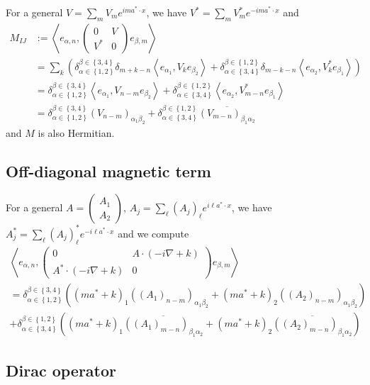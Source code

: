 \documentclass[11pt,a4paper,reqno,french,tikz]{amsart}
\newcommand{\pa}[1]{\left( #1 \right)} %
\newcommand{\acs}[1]{\left\{ #1 \right\}} %
\newcommand{\ps}[1]{\left< #1 \right>} %
\newcommand{\na}{\nabla} %
\newcommand{\mat}[1]{\begin{pmatrix} #1 \end{pmatrix}} %
\begin{document}
For a general $V = \sum_m V_m e^{im a^* \cdot x}$, we have $V^* = \sum_m V_m^* e^{-im a^* \cdot x}$ and
\begin{align*}
	M_{IJ} & := \ps{e_{\alpha,n}, \mat{0 & V \\ V^* & 0} e_{\beta,m}} \\
	       &= \sum_{k} \pa{\delta_{\alpha \in \acs{1,2}}^{\beta \in \acs{3,4}} \delta_{m+k-n} \ps{e_{\alpha_1},V_k e_{\beta_2}} + \delta_{\alpha \in \acs{3,4}}^{\beta \in \acs{1,2}}\delta_{m-k-n} \ps{e_{\alpha_2},V_k^* e_{\beta_1}}} \\
	       &=   \delta_{\alpha \in \acs{1,2}}^{\beta \in \acs{3,4}}\ps{e_{\alpha_1},V_{n-m} e_{\beta_2}} + \delta_{\alpha \in \acs{3,4}}^{\beta \in \acs{1,2}}\ps{e_{\alpha_2},V_{m-n}^* e_{\beta_1}} \\
	       &=     \delta_{\alpha \in \acs{1,2}}^{\beta \in \acs{3,4}}\pa{V_{n-m}}_{\alpha_1 \beta_2} + \delta_{\alpha \in \acs{3,4}}^{\beta \in \acs{1,2}} \overline{\pa{V_{m-n}}_{\beta_1\alpha_2} }
\end{align*}
and $M$ is also Hermitian.

\subsection{Off-diagonal magnetic term}%
\label{sub:off_diagonal_magnetic_term}



For a general $A = \mat{A_1 \\ A_2}$, $A_j = \sum_\ell  \pa{A_j}_\ell  e^{i\ell a^*\cdot x}$, we have $A_j^* = \sum_\ell  \pa{A_j}^*_\ell  e^{-i\ell a^*\cdot x}$ and we compute
\begin{multline*}
\ps{e_{\alpha,n}, \mat{0 & A \cdot \pa{-i\na +k} \\A^* \cdot \pa{-i\na +k}  & 0} e_{\beta,m}} \\
= \delta_{\alpha \in \acs{1,2}}^{\beta \in \acs{3,4}} \pa{ \pa{ma^* +k}_1 \pa{\pa{A_1}_{n-m}}_{\alpha_1 \beta_2} + \pa{ma^* +k}_2 \pa{\pa{A_2}_{n-m}}_{\alpha_1 \beta_2}}\\
+ \delta_{\alpha \in \acs{3,4}}^{\beta \in \acs{1,2}} \pa{ \pa{ma^* +k}_1 \overline{\pa{\pa{A_1}_{m-n}}_{\beta_1 \alpha_2}} + \pa{ma^* +k}_2 \overline{\pa{\pa{A_2}_{m-n}}_{\beta_1 \alpha_2}}}
\end{multline*}


\subsection{Dirac operator}%
\label{sub:dirac_operator}
\end{document}
